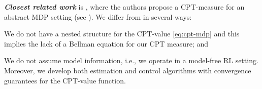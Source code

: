 \noindent
\textit{\textbf{Closest related work}} is \cite{lin2013stochastic}, where the authors propose a CPT-measure for an abstract MDP setting (see \cite{bertsekas2013abstract}). We differ from \cite{lin2013stochastic} in several ways:
\begin{inparaenum}[\bfseries (i)]
\item We do not have a nested structure for the CPT-value \eqref{eq:cpt-mdp} and this implies the lack of a Bellman equation for our CPT measure; and
\item We do not assume model information, i.e., we operate in a model-free RL setting. Moreover, we develop both estimation and control algorithms with convergence guarantees for the CPT-value function.
\end{inparaenum}

